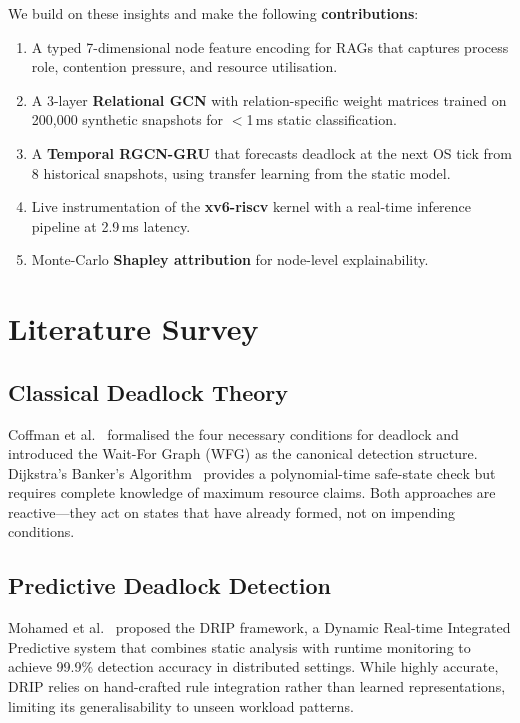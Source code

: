 \documentclass[conference]{IEEEtran}
\begin{document}
We build on these insights and make the following \textbf{contributions}:
\begin{enumerate}
  \item A typed 7-dimensional node feature encoding for RAGs that captures
        process role, contention pressure, and resource utilisation.
  \item A 3-layer \textbf{Relational GCN} with relation-specific weight matrices
        trained on 200,000 synthetic snapshots for $<$1\,ms static classification.
  \item A \textbf{Temporal RGCN-GRU} that forecasts deadlock at the next OS tick
        from 8 historical snapshots, using transfer learning from the static model.
  \item Live instrumentation of the \textbf{xv6-riscv} kernel with a real-time
        inference pipeline at 2.9\,ms latency.
  \item Monte-Carlo \textbf{Shapley attribution} for node-level explainability.
\end{enumerate}

\section{Literature Survey}

\subsection{Classical Deadlock Theory}

Coffman et al.~\cite{coffman1971} formalised the four necessary conditions for
deadlock and introduced the Wait-For Graph (WFG) as the canonical detection
structure. Dijkstra's Banker's Algorithm~\cite{dijkstra1965} provides a
polynomial-time safe-state check but requires complete knowledge of maximum
resource claims. Both approaches are reactive—they act on states that have
already formed, not on impending conditions.

\subsection{Predictive Deadlock Detection}

Mohamed et al.~\cite{drip2024} proposed the DRIP framework, a Dynamic
Real-time Integrated Predictive system that combines static analysis with
runtime monitoring to achieve 99.9\% detection accuracy in distributed settings.
While highly accurate, DRIP relies on hand-crafted rule integration rather than
learned representations, limiting its generalisability to unseen workload
patterns.
\end{document}
